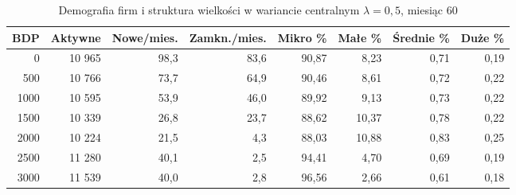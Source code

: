 \begin{table}[H]
\centering
\scriptsize
\caption{Demografia firm i struktura wielkości w wariancie centralnym \(\lambda = 0{,}5\), miesiąc 60}
\label{tab:firm-demography-size}
\begin{tabular}{@{}r r r r r r r r@{}}
\toprule
\textbf{BDP} & \textbf{Aktywne} & \textbf{Nowe/mies.} & \textbf{Zamkn./mies.} & \textbf{Mikro \%} & \textbf{Małe \%} & \textbf{Średnie \%} & \textbf{Duże \%} \\
\midrule
0 & 10 965 & 98,3 & 83,6 & 90,87 & 8,23 & 0,71 & 0,19 \\
500 & 10 766 & 73,7 & 64,9 & 90,46 & 8,61 & 0,72 & 0,22 \\
1000 & 10 595 & 53,9 & 46,0 & 89,92 & 9,13 & 0,73 & 0,22 \\
1500 & 10 339 & 26,8 & 23,7 & 88,62 & 10,37 & 0,78 & 0,22 \\
2000 & 10 224 & 21,5 & 4,3 & 88,03 & 10,88 & 0,83 & 0,25 \\
2500 & 11 280 & 40,1 & 2,5 & 94,41 & 4,70 & 0,69 & 0,19 \\
3000 & 11 539 & 40,0 & 2,8 & 96,56 & 2,66 & 0,61 & 0,18 \\
\bottomrule
\end{tabular}
\end{table}
